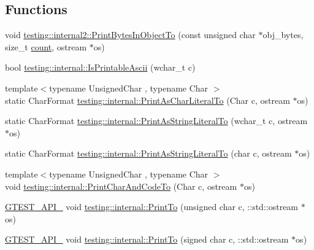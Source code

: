 \subsection*{Functions}
\begin{DoxyCompactItemize}
\item 
void \mbox{\hyperlink{namespacetesting_1_1internal2_abfb9aa80365f93b952e9a4bea09947a8}{testing\+::internal2\+::\+Print\+Bytes\+In\+Object\+To}} (const unsigned char $\ast$obj\+\_\+bytes, size\+\_\+t \mbox{\hyperlink{gmock__stress__test_8cc_afd9db40e3361ae09188795e8cbe19752}{count}}, ostream $\ast$os)
\item 
bool \mbox{\hyperlink{namespacetesting_1_1internal_a744a6dd74c12d1e2c16b3c03e14ed4d4}{testing\+::internal\+::\+Is\+Printable\+Ascii}} (wchar\+\_\+t c)
\item 
{\footnotesize template$<$typename Unsigned\+Char , typename Char $>$ }\\static Char\+Format \mbox{\hyperlink{namespacetesting_1_1internal_ab73d250fde6dfbf16111afb7a071dc3f}{testing\+::internal\+::\+Print\+As\+Char\+Literal\+To}} (Char c, ostream $\ast$os)
\item 
static Char\+Format \mbox{\hyperlink{namespacetesting_1_1internal_a8c5838995d7bb9e4232b69e6bcdb9ab8}{testing\+::internal\+::\+Print\+As\+String\+Literal\+To}} (wchar\+\_\+t c, ostream $\ast$os)
\item 
static Char\+Format \mbox{\hyperlink{namespacetesting_1_1internal_a82e5b3cf45fd9c4603dbe14bc4cb38c2}{testing\+::internal\+::\+Print\+As\+String\+Literal\+To}} (char c, ostream $\ast$os)
\item 
{\footnotesize template$<$typename Unsigned\+Char , typename Char $>$ }\\void \mbox{\hyperlink{namespacetesting_1_1internal_a0c577e598e61d339ba45dd6643fb1969}{testing\+::internal\+::\+Print\+Char\+And\+Code\+To}} (Char c, ostream $\ast$os)
\item 
\mbox{\hyperlink{gtest-port_8h_aa73be6f0ba4a7456180a94904ce17790}{G\+T\+E\+S\+T\+\_\+\+A\+P\+I\+\_\+}} void \mbox{\hyperlink{namespacetesting_1_1internal_ab7524d6d3ab8c31b1deea88bf61783bb}{testing\+::internal\+::\+Print\+To}} (unsigned char c, \+::std\+::ostream $\ast$os)
\item 
\mbox{\hyperlink{gtest-port_8h_aa73be6f0ba4a7456180a94904ce17790}{G\+T\+E\+S\+T\+\_\+\+A\+P\+I\+\_\+}} void \mbox{\hyperlink{namespacetesting_1_1internal_ad453af399370e394881079c243abacb4}{testing\+::internal\+::\+Print\+To}} (signed char c, \+::std\+::ostream $\ast$os)
\item 

\end{DoxyCompactItemize}
